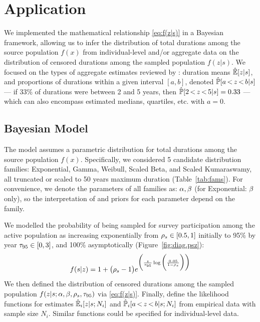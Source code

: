 \section{Application}\label{appl}
We implemented the mathematical relationship \eqref{eq:f(z|s)}
in a Bayesian framework, allowing us to infer
the distribution of total durations among the source population $f(x)$
from individual-level and/or aggregate data on
the distribution of censored durations among the sampled population $f(z|s)$.
We focused on the types of aggregate estimates reviewed by \citet{Fazito2012}:
duration means $\sE[z|s]$, and
proportions of durations within a given interval $[a,b]$, denoted $\sP[\azb|s]$
--- \eg if 33\% of durations were between 2 and 5 years, then $\sP[\lzu25|s] = 0.33$ ---
which can also encompass estimated medians, quartiles, etc. with $a=0$.
\subsection{Bayesian Model}
The model assumes a parametric distribution for
total durations among the source population $f(x)$.
Specifically, we considered 5 candidate distribution families:
Exponential, Gamma, Weibull, Scaled Beta, and Scaled Kumaraswamy,
all truncated or scaled to 50 years maximum duration (Table~\ref{tab:fams}).
For convenience, we denote the parameters of all families as: $\aa,\bb$
(for Exponential: $\bb$ only),
so the interpretation of and priors for each parameter depend on the family.
\par
We modelled the probability of
being sampled for survey participation among the active population as
increasing exponentially from $\pp \in [0.5,1]$ initially
to 95\% by year $\tt \in [0,3]$, and 100\% asymptotically
(Figure~\ref{fig:diag.psz}):
\begin{equation}
  f(s|z) = 1 + \big(\pp-1\big)
    e^{\bigg(\frac{z}{\tt}\log\bigg(\frac{0.05}{1-\pp}\bigg)\bigg)}
  \label{eq:f(s|z)}
\end{equation}
We then defined the distribution of censored durations among the sampled population
$f(z|s;\aa,\bb,\pp,\tt)$ via \eqref{eq:f(z|s)}.
Finally,  define the likelihood functions for
estimates $\sE_i[z|s;N_i]$ and $\sP_i[\azb|s;N_i]$
from empirical data with sample size $N_i$.
Similar functions could be specified for individual-level data.
